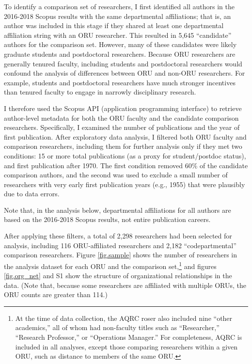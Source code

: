 \documentclass[
  11pt,
]{article}
\begin{document}
To identify a comparison set of researchers, I first identified all authors in the 2016-2018 Scopus results with the same departmental affiliations; that is, an author was included in this stage if they shared at least one departmental affiliation string with an ORU researcher. This resulted in 5,645 ``candidate'' authors for the comparison set. However, many of these candidates were likely graduate students and postdoctoral researchers. Because ORU researchers are generally tenured faculty, including students and postdoctoral researchers would confound the analysis of differences between ORU and non-ORU researchers. For example, students and postdoctoral researchers have much stronger incentives than tenured faculty to engage in narrowly disciplinary research.

I therefore used the Scopus API (application programming interface) to retrieve author-level metadata for both the ORU faculty and the candidate comparison researchers. Specifically, I examined the number of publications and the year of first publication. After exploratory data analysis, I filtered both ORU faculty and comparison researchers, including them for further analysis only if they met two conditions: 15 or more total publications (as a proxy for student/postdoc status), and first publication after 1970. The first condition removed 60\% of the candidate comparison authors, and the second was used to exclude a small number of researchers with very early first publication years (e.g., 1955) that were plausibly due to data errors.

Note that, in the analysis below, departmental affiliations for all authors are based on the 2016-2018 Scopus results, not entire publication careers.

After applying these filters, a total of 2,298 researchers had been selected for analysis, including 116 ORU-affiliated researchers and 2,182 ``codepartmental'' comparison researchers. Figure \ref{fig.sample} shows the number of researchers in the analysis dataset for each ORU and the comparison set,\footnote{At the time of data collection, the AQRC roser also included nine ``other academics,'' all of whom had non-faculty titles such as ``Researcher,'' ``Research Professor,'' or ``Operations Manager.'' For completeness, AQRC is included in all analyses, except those comparing researchers within a given ORU, such as distance to members of the same ORU.} and figures \ref{fig.org_net} and S1 show the structure of organizational relationships in the data. (Note that, because some researchers are affiliated with multiple ORUs, the ORU counts are greater than 114.)
\end{document}
